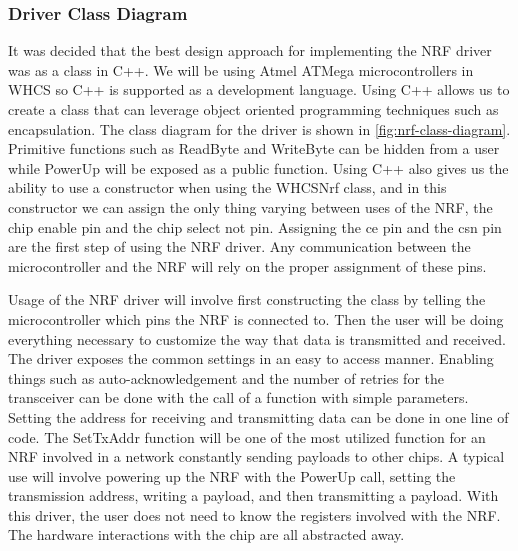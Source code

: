 \subsubsection{Driver Class Diagram}
It was decided that the best design approach for implementing the NRF driver
was as a class in C++. We will be using Atmel ATMega microcontrollers in WHCS so C++
is supported as a development language. Using C++ allows us to create a class
that can leverage object oriented programming techniques such as encapsulation.
The class diagram for the driver is shown in \autoref{fig:nrf-class-diagram}.
Primitive functions such as ReadByte and WriteByte can be hidden from a user
while PowerUp will be exposed as a public function. Using C++ also gives us the
ability to use a constructor when using the WHCSNrf class, and in this
constructor we can assign the only thing varying between uses of the NRF, the
chip enable pin and the chip select not pin. Assigning the ce pin and the csn
pin are the first step of using the NRF driver. Any communication between the
microcontroller and the NRF will rely on the proper assignment of these pins.


Usage of the NRF driver will involve first constructing the class by telling
the microcontroller which pins the NRF is connected to. Then the user will be
doing everything necessary to customize the way that data is transmitted and
received. The driver exposes the common settings in an easy to access manner.
Enabling things such as auto{}-acknowledgement and the number of retries for
the transceiver can be done with the call of a function with simple parameters.
Setting the address for receiving and transmitting data can be done in one line
of code. The SetTxAddr function will be one of the most utilized function for
an NRF involved in a network constantly sending payloads to other chips. A
typical use will involve powering up the NRF with the PowerUp call, setting the
transmission address, writing a payload, and then transmitting a payload. With
this driver, the user does not need to know the registers involved with the
NRF. The hardware interactions with the chip are all abstracted away.

